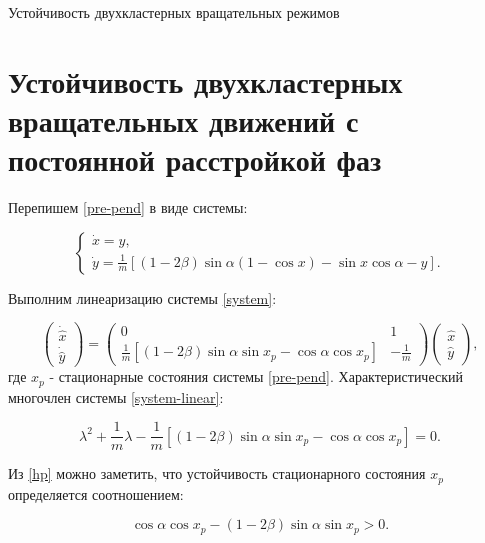 \begin{chapter}{Устойчивость двухкластерных вращательных режимов}
	\section{Устойчивость двухкластерных вращательных движений с постоянной расстройкой фаз}
	
	Перепишем \eqref{pre-pend} в виде системы:
	
	\begin{equation} \label{system}
		\begin{cases}
			\dot{x} = y, \\
			\dot{y} = \frac{1}{m} \left[ (1 - 2\beta)\sin{\alpha}(1 - \cos{x}) - \sin{x}\cos{\alpha} - y \right].
		\end{cases}
	\end{equation}
	
	Выполним линеаризацию системы \eqref{system}:
	
	\begin{equation} \label{system-linear}
		\begin{pmatrix}
			\dot{\hat{x}} \\
			\dot{\hat{y}}
		\end{pmatrix}
		=
		\begin{pmatrix}
			0 & 1 \\
			\frac{1}{m}\left[ (1 - 2\beta)\sin{\alpha}\sin{x_p} - \cos{\alpha}\cos{x_p} \right] & -\frac{1}{m}
		\end{pmatrix}
		\begin{pmatrix}
			\hat{x} \\
			\hat{y}
		\end{pmatrix},
	\end{equation}
	где $x_p$ - стационарные состояния системы \eqref{pre-pend}. Характеристический многочлен системы \eqref{system-linear}:
	
	\begin{equation} \label{hp}
		\lambda^2 + \frac{1}{m}\lambda - \frac{1}{m}\left[ (1 - 2\beta)\sin{\alpha}\sin{x_p} - \cos{\alpha}\cos{x_p} \right] = 0.
	\end{equation}
	
	Из \eqref{hp} можно заметить, что устойчивость стационарного состояния $x_p$ определяется соотношением:
	
	\begin{equation} \label{hp-stability}
		\cos{\alpha}\cos{x_p} - (1 - 2\beta)\sin{\alpha}\sin{x_p} > 0.
	\end{equation}
	

\end{chapter}
